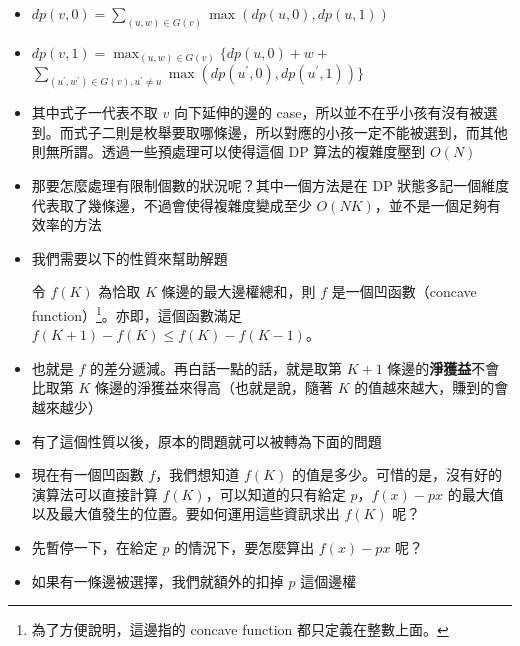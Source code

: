 \documentclass[standalone]{beamer}
\begin{document}
\begin{frame}{}
  \begin{itemize}
    \item $dp(v, 0) = \sum_{(u, w) \in G(v)}\max(dp(u, 0), dp(u, 1))$

    \item $dp(v, 1) = \max_{(u, w) \in G(v)} \{dp(u, 0) + w +$ $ 
      \sum_{(u^\prime, w^\prime) \in G(v), u^\prime \neq u}\max(dp(u^\prime, 0), dp(u^\prime, 1)) \}$

    \item 其中式子一代表不取 $v$ 向下延伸的邊的 case，所以並不在乎小孩有沒有被選到。而式子二則是枚舉要取哪條邊，所以對應的小孩一定不能被選到，而其他則無所謂。透過一些預處理可以使得這個 DP 算法的複雜度壓到 $O(N)$
    \item 那要怎麼處理有限制個數的狀況呢？其中一個方法是在 DP 狀態多記一個維度代表取了幾條邊，不過會使得複雜度變成至少 $O(NK)$，並不是一個足夠有效率的方法
  \end{itemize}
\end{frame}

\begin{frame}{}
  \begin{itemize}
    \item 我們需要以下的性質來幫助解題
    \begin{theorem}[性質]
      令 $f(K)$ 為恰取 $K$ 條邊的最大邊權總和，則 $f$ 是一個凹函數（concave function）\footnote{為了方便說明，這邊指的 concave function 都只定義在整數上面。}。亦即，這個函數滿足 $f(K + 1) - f(K) \leq f(K) - f(K - 1)$。
    \end{theorem}
    \item 也就是 $f$ 的差分遞減。再白話一點的話，就是取第 $K + 1$ 條邊的\textbf{淨獲益}不會比取第 $K$ 條邊的淨獲益來得高（也就是說，隨著 $K$ 的值越來越大，賺到的會越來越少）
    \item 有了這個性質以後，原本的問題就可以被轉為下面的問題
  \end{itemize}
\end{frame}

\begin{frame}{}
  \begin{itemize}
    \item 
    \begin{problem}[等價的問題]
      現在有一個凹函數 $f$，我們想知道 $f(K)$ 的值是多少。可惜的是，沒有好的演算法可以直接計算 $f(K)$，可以知道的只有給定 $p$，$f(x) - px$ 的最大值以及最大值發生的位置。要如何運用這些資訊求出 $f(K)$ 呢？
    \end{problem}
    \item 先暫停一下，在給定 $p$ 的情況下，要怎麼算出 $f(x) - px$ 呢？
    \item 如果有一條邊被選擇，我們就額外的扣掉 $p$ 這個邊權
  \end{itemize}
\end{frame}
\end{document}
